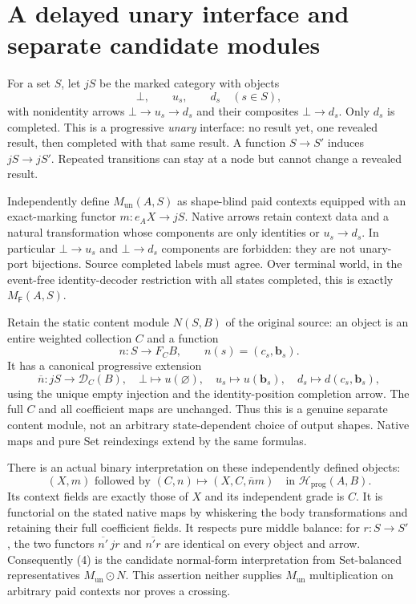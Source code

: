 \documentclass[11pt]{article}\usepackage{amsmath,amssymb,amsthm,geometry}\geometry{margin=1in}
\begin{document}
\section{A delayed unary interface and separate candidate modules}
For a set $S$, let $jS$ be the marked category with objects
\[
 \bot,\qquad u_s,\qquad d_s\quad(s\in S),
\]
with nonidentity arrows $\bot\to u_s\to d_s$ and their composites $\bot\to d_s$. Only $d_s$ is completed. This is a progressive \emph{unary} interface: no result yet, one revealed result, then completed with that same result. A function $S\to S'$ induces $jS\to jS'$. Repeated transitions can stay at a node but cannot change a revealed result.

Independently define $M_{\mathrm{un}}(A,S)$ as shape-blind paid contexts equipped with an exact-marking functor $m:e_AX\to jS$. Native arrows retain context data and a natural transformation whose components are only identities or $u_s\to d_s$. In particular $\bot\to u_s$ and $\bot\to d_s$ components are forbidden: they are not unary-port bijections. Source completed labels must agree. Over terminal world, in the event-free identity-decoder restriction with all states completed, this is exactly $M_{\mathsf F}(A,S)$.

Retain the static content module $N(S,B)$ of the original source: an object is an entire weighted collection $C$ and a function
\[
 n:S\longrightarrow F_CB,\qquad n(s)=(c_s,\mathbf b_s).
\]
It has a canonical progressive extension
\[
 \overline n:jS\longrightarrow\mathcal D_C(B),\quad
 \bot\mapsto u(\varnothing),\quad u_s\mapsto u(\mathbf b_s),\quad
 d_s\mapsto d(c_s,\mathbf b_s),                         \tag{3}
\]
using the unique empty injection and the identity-position completion arrow. The full $C$ and all coefficient maps are unchanged. Thus this is a genuine separate content module, not an arbitrary state-dependent choice of output shapes. Native maps and pure Set reindexings extend by the same formulas.

There is an actual binary interpretation on these independently defined objects:
\[
 (X,m)\text{ followed by }(C,n)\longmapsto (X,C,\overline n m)
              \quad\text{in }\mathcal H_{\mathrm{prog}}(A,B).       \tag{4}
\]
Its context fields are exactly those of $X$ and its independent grade is $C$. It is functorial on the stated native maps by whiskering the body transformations and retaining their full coefficient fields. It respects pure middle balance: for $r:S\to S'$, the two functors $\overline{n'}\,jr$ and $\overline{n' r}$ are identical on every object and arrow. Consequently (4) is the candidate normal-form interpretation from Set-balanced representatives $M_{\mathrm{un}}\odot N$. This assertion neither supplies $M_{\mathrm{un}}$ multiplication on arbitrary paid contexts nor proves a crossing.
\end{document}
